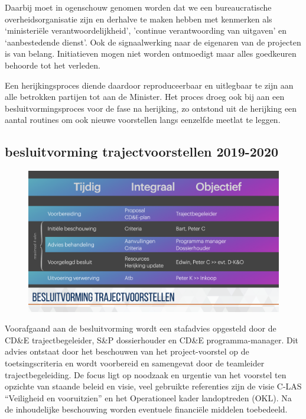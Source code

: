 \documentclass[
]{book}
\begin{document}
Daarbij moet in ogenschouw genomen worden dat we een bureaucratische overheidsorganisatie zijn en derhalve te maken hebben met kenmerken als `ministeriële verantwoordelijkheid', 'continue verantwoording van uitgaven' en `aanbestedende dienst'. Ook de signaalwerking naar de eigenaren van de projecten is van belang. Initiatieven mogen niet worden ontmoedigt maar alles goedkeuren behoorde tot het verleden.

Een herijkingsproces diende daardoor reproduceerbaar en uitlegbaar te zijn aan alle betrokken partijen tot aan de Minister. Het proces droeg ook bij aan een besluitvormingsproces voor de fase na herijking, zo ontstond uit de herijking een aantal routines om ook nieuwe voorstellen langs eenzelfde meetlat te leggen.

\hypertarget{besluitvorming-trajectvoorstellen-2019-2020}{%
\subsection{besluitvorming trajectvoorstellen 2019-2020}\label{besluitvorming-trajectvoorstellen-2019-2020}}

\begin{figure}

{\centering \includegraphics[width=0.5\linewidth]{data/keynote-slides/20200430-CDE-Designprocess/20200430-CDE-Designprocess.037} 

}

\caption{ }\label{fig:unnamed-chunk-26}
\end{figure}

Voorafgaand aan de besluitvorming wordt een stafadvies opgesteld door de CD\&E trajectbegeleider, S\&P dossierhouder en CD\&E programma-manager. Dit advies ontstaat door het beschouwen van het project-voorstel op de toetsingscriteria en wordt voorbereid en samengevat door de teamleider trajectbegeleiding. De focus ligt op noodzaak en urgentie van het voorstel ten opzichte van staande beleid en visie, veel gebruikte referenties zijn de visie C-LAS ``Veiligheid en vooruitzien'' en het Operationeel kader landoptreden (OKL). Na de inhoudelijke beschouwing worden eventuele financiële middelen toebedeeld.
\end{document}
